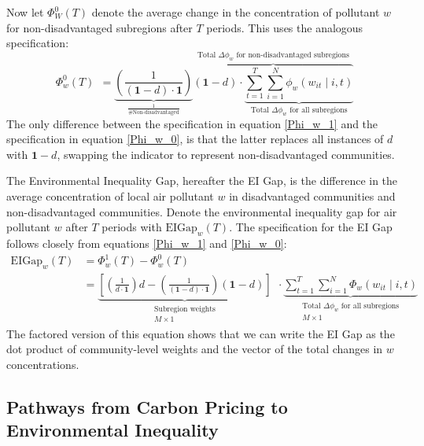 Now let $\Phi_W^0(T)$ denote the average change in the concentration of pollutant $w$ for non-disadvantaged subregions after $T$ periods. This uses the analogous specification:
\begin{equation} \label{Phi_w_0}
    \Phi_w^0(T) ~~ = \underbrace{\left(\frac{1}{(\textbf{1} - d) \cdot \textbf{1}}\right)}_{\frac{1}{\text{\# Non-disadvantaged}}} \overbrace{\left(\textbf{1} - d\right) \cdot \underbrace{\sum_{t = 1}^T \sum_{i=1}^N \phi_w(w_{it}\mid i, t)}_{\text{Total $\Delta \phi_w$ for all subregions}} }^\text{Total $\Delta \phi_w$ for non-disadvantaged subregions}
\end{equation}
The only difference between the specification in equation \eqref{Phi_w_1} and the specification in equation \eqref{Phi_w_0}, is that the latter replaces all instances of $d$ with $\textbf{1} - d$, swapping the indicator to represent non-disadvantaged communities. 

The Environmental Inequality Gap, hereafter the EI Gap, is the difference in the average concentration of local air pollutant $w$ in disadvantaged communities and non-disadvantaged communities. Denote the environmental inequality gap for air pollutant $w$ after $T$ periods with $\text{EIGap}_w(T)$. The specification for the EI Gap follows closely from equations \eqref{Phi_w_1} and \eqref{Phi_w_0}:
\begin{align}
    \text{EIGap}_w(T) &= \Phi_w^1(T) - \Phi_w^0(T) \\
        &= \underbrace{\left[
            \left(\frac{1}{d \cdot \textbf{1}}\right) d - \left(\frac{1}{(\textbf{1} - d) \cdot \textbf{1}}\right) \left(\textbf{1} - d\right)
        \right]}_{\substack{\text{Subregion weights}\\ M\times 1 }} ~~ \cdot \underbrace{\sum_{t = 1}^T \sum_{i=1}^N \Phi_w(w_{it}\mid i, t)}_{\substack{\text{Total $\Delta \phi_w$ for all subregions}\\ M \times 1}}
\end{align}
The factored version of this equation shows that we can write the EI Gap as the dot product of community-level weights and the vector of the total changes in $w$ concentrations. 


\subsection{Pathways from Carbon Pricing to Environmental Inequality}

